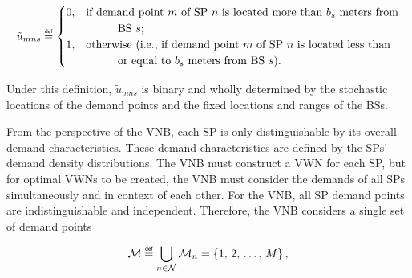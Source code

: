 \documentclass[12pt,dvipsnames]{report}
\newif\ifisdoublespacing
\newcommand\defeq{\mathrel{\overset{\makebox[0pt]{\mbox{\normalfont\tiny\sffamily def}}}{=}}}
\newcommand\tab[1][1cm]{\hspace*{#1}}
\begin{document}
\ifisdoublespacing
	\begin{singlespacing}
		\begin{equation} \label{eq:umns_simp}
			\tilde{u}_{mns} \defeq
			\begin{cases}
				0,& \text{if demand point $m$ of SP $n$ is located more than $b_s$ meters from}\\
				& \text{\tab BS $s$;}\\
				\\
				1,& \text{otherwise (i.e., if demand point $m$ of SP $n$ is located less than}\\
				& \text{\tab or equal to $b_s$ meters from BS $s$).}\\
			\end{cases}
		\end{equation}
	\end{singlespacing}
\else
	\begin{equation} \label{eq:umns_simp}
		\tilde{u}_{mns} \defeq
		\begin{cases}
			0,& \text{if demand point $m$ of SP $n$ is located more than $b_s$ meters from}\\
			& \text{\tab BS $s$;}\\
			1,& \text{otherwise (i.e., if demand point $m$ of SP $n$ is located less than}\\
			& \text{\tab or equal to $b_s$ meters from BS $s$).}\\
		\end{cases}
	\end{equation}
\fi

\noindent Under this definition, $\tilde{u}_{mns}$ is binary and wholly determined by the stochastic locations of the demand points and the fixed locations and ranges of the BSs.

From the perspective of the VNB, each SP is only distinguishable by its overall demand characteristics.  These demand characteristics are defined by the SPs' demand density distributions.  The VNB must construct a VWN for each SP, but for optimal VWNs to be created, the VNB must consider the demands of all SPs simultaneously and in context of each other.  For the VNB, all SP demand points are indistinguishable and independent.  Therefore, the VNB considers a single set of demand points

\begin{equation} \label{eq:union_M}
	\mathcal{M} \defeq \bigcup_{n \in \mathcal{N}} \mathcal{M}_n = \left\{ 1,\, 2,\, \ldots,\, M \right\},
\end{equation}
\end{document}
